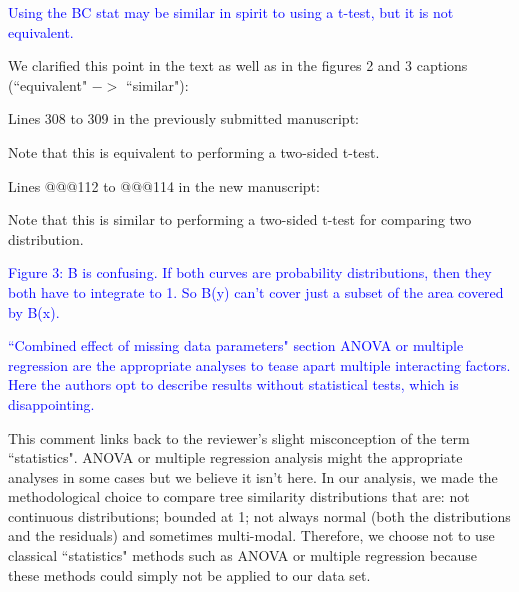 \documentclass[11pt]{letter}
\begin{document}
\begin{letter}{}

\textcolor{blue}{Using the BC stat may be similar in spirit to using a t-test, but it is not equivalent.}

We clarified this point in the text as well as in the figures 2 and 3 captions (``equivalent" $->$ ``similar"):

Lines 308 to 309 in the previously submitted manuscript:

\hfill\begin{minipage}{\dimexpr\textwidth-1cm}
Note that this is equivalent to performing a two-sided t-test.
\end{minipage}

Lines @@@112 to @@@114 in the new manuscript:

\hfill\begin{minipage}{\dimexpr\textwidth-1cm}
Note that this is similar to performing a two-sided t-test for comparing two distribution.
\end{minipage}


\textcolor{blue}{Figure 3: B is confusing. If both curves are probability distributions, then they both have to integrate to 1. So B(y) can't cover just a subset of the area covered by B(x).}




\textcolor{blue}{``Combined effect of missing data parameters" section ANOVA or multiple regression are the appropriate analyses to tease apart multiple interacting factors. Here the authors opt to describe results without statistical tests, which is disappointing.}

This comment links back to the reviewer's slight misconception of the term ``statistics". ANOVA or multiple regression analysis might the appropriate analyses in some cases but we believe it isn't here. In our analysis, we made the methodological choice to compare tree similarity distributions that are: not continuous distributions; bounded at 1; not always normal (both the distributions and the residuals) and sometimes multi-modal. Therefore, we choose not to use classical ``statistics" methods such as ANOVA or multiple regression because these methods could simply not be applied to our data set.


\end{letter}
\end{document}
